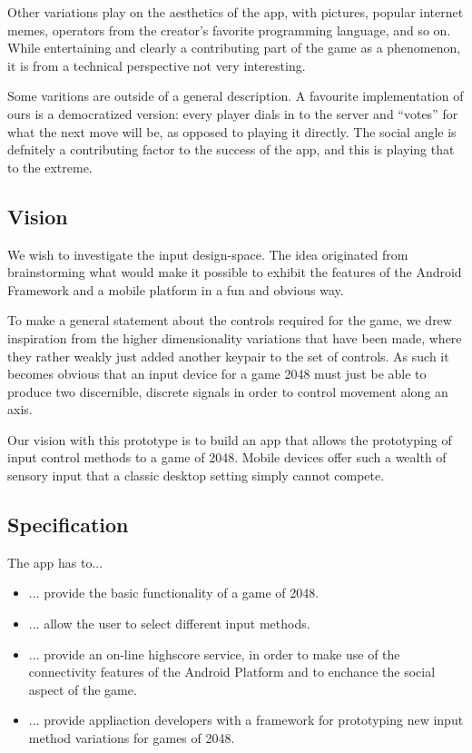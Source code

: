 \documentclass[a4paper, 12pt]{article}
\begin{document}
Other variations play on the aesthetics of the app, with pictures,
popular internet memes, operators from the creator's favorite
programming language, and so on. While entertaining and clearly a
contributing part of the game as a phenomenon, it is from a technical
perspective not very interesting.

Some varitions are outside of a general description. A favourite
implementation of ours is a democratized version: every player dials
in to the server and ``votes'' for what the next move will be, as
opposed to playing it directly. The social angle is defnitely a
contributing factor to the success of the app, and this is playing
that to the extreme.

\subsection{Vision}

We wish to investigate the input design-space. The idea originated
from brainstorming what would make it possible to exhibit the features
of the Android Framework and a mobile platform in a fun and obvious
way.

To make a general statement about the controls required for the game,
we drew inspiration from the higher dimensionality variations that
have been made, where they rather weakly just added another keypair to
the set of controls. As such it becomes obvious that an input device
for a game 2048 must just be able to produce two discernible, discrete
signals in order to control movement along an axis. 

Our vision with this prototype is to build an app that allows the
prototyping of input control methods to a game of 2048. Mobile devices
offer such a wealth of sensory input that a classic desktop setting
simply cannot compete. 

\subsection{Specification}

The app has to...
\begin{itemize}
\item ... provide the basic functionality of a game of 2048.
\item ... allow the user to select different input methods.
\item ... provide an on-line highscore service, in order to make use
  of the connectivity features of the Android Platform and to enchance
  the social aspect of the game.
\item ... provide appliaction developers with a framework for
  prototyping new input method variations for games of 2048.
\end{itemize}
\end{document}
